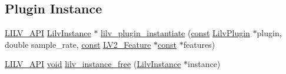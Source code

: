 \subsection*{Plugin Instance}
\begin{DoxyCompactItemize}
\item 
\hyperlink{lilv_8h_aa5182eee7ddff96862d0171967ee6f77}{L\+I\+L\+V\+\_\+\+A\+PI} \hyperlink{lilv_8h_acdb0d241e2506a6f59bd2d8dd427b99c}{Lilv\+Instance} $\ast$ \hyperlink{group__lilv_ga10eec215ea5fa4fa45d0508e840f3c8b}{lilv\+\_\+plugin\+\_\+instantiate} (\hyperlink{getopt1_8c_a2c212835823e3c54a8ab6d95c652660e}{const} \hyperlink{lilv_8h_a94e36303167a78a0c392f881136b461b}{Lilv\+Plugin} $\ast$plugin, double sample\+\_\+rate, \hyperlink{getopt1_8c_a2c212835823e3c54a8ab6d95c652660e}{const} \hyperlink{lv2_8h_a78d13b607443404459db283371723234}{L\+V2\+\_\+\+Feature} $\ast$\hyperlink{getopt1_8c_a2c212835823e3c54a8ab6d95c652660e}{const} $\ast$features)
\item 
\hyperlink{lilv_8h_aa5182eee7ddff96862d0171967ee6f77}{L\+I\+L\+V\+\_\+\+A\+PI} \hyperlink{sound_8c_ae35f5844602719cf66324f4de2a658b3}{void} \hyperlink{group__lilv_gadad7cb14d78818de84d642c39a0c19d8}{lilv\+\_\+instance\+\_\+free} (\hyperlink{lilv_8h_acdb0d241e2506a6f59bd2d8dd427b99c}{Lilv\+Instance} $\ast$instance)
\end{DoxyCompactItemize}

